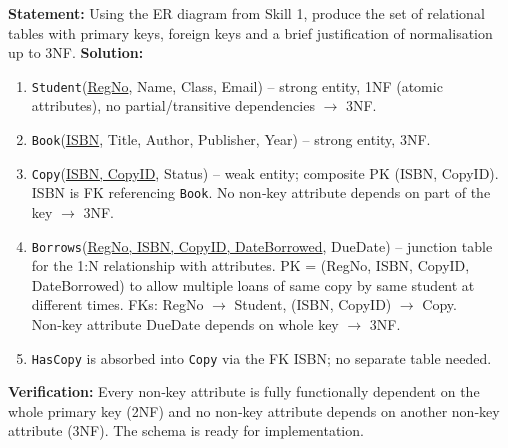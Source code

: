 \documentclass[11pt]{article}
\begin{document}
\begin{exoresolu}
\textbf{Statement:} Using the ER diagram from Skill 1, produce the set of relational tables with primary keys, foreign keys and a brief justification of normalisation up to 3NF.
\tcblower
\textbf{Solution:}
\begin{enumerate}
\item \texttt{Student}(\underline{RegNo}, Name, Class, Email) -- strong entity, 1NF (atomic attributes), no partial/transitive dependencies $\rightarrow$ 3NF.
\item \texttt{Book}(\underline{ISBN}, Title, Author, Publisher, Year) -- strong entity, 3NF.
\item \texttt{Copy}(\underline{ISBN, CopyID}, Status) -- weak entity; composite PK (ISBN, CopyID). ISBN is FK referencing \texttt{Book}. No non‑key attribute depends on part of the key $\rightarrow$ 3NF.
\item \texttt{Borrows}(\underline{RegNo, ISBN, CopyID, DateBorrowed}, DueDate) -- junction table for the 1:N relationship with attributes. PK = (RegNo, ISBN, CopyID, DateBorrowed) to allow multiple loans of same copy by same student at different times. FKs: RegNo $\rightarrow$ Student, (ISBN, CopyID) $\rightarrow$ Copy. Non‑key attribute DueDate depends on whole key $\rightarrow$ 3NF.
\item \texttt{HasCopy} is absorbed into \texttt{Copy} via the FK ISBN; no separate table needed.
\end{enumerate}
\textbf{Verification:} Every non‑key attribute is fully functionally dependent on the whole primary key (2NF) and no non‑key attribute depends on another non‑key attribute (3NF). The schema is ready for implementation.
\end{exoresolu}
\end{document}
